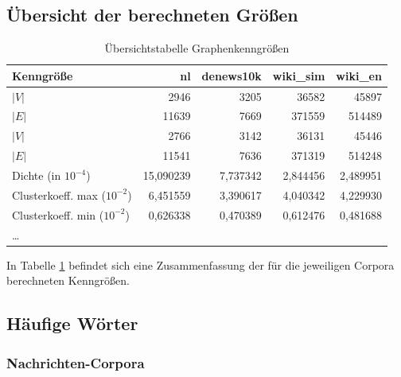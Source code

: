 \documentclass[11pt, a4paper]{article}
\begin{document}
\subsection{Übersicht der berechneten Größen}
\begin{table}[ht]
    \begin{tabular}{l*{4}{r}}
    \toprule
    Kenngröße & nl & denews10k & wiki\_sim & wiki\_en \\
    \midrule
    $|V|$                       & 2946      & 3205      & 36582     & 45897  \\
    $|E|$                       & 11639     & 7669      & 371559    & 514489 \\
    $|V|$\footnotemark[6]       & 2766      & 3142      & 36131     & 45446  \\
    $|E|$\footnotemark[6]       & 11541     & 7636      & 371319    & 514248 \\
    Dichte (in $10^{-4}$)       & 15,090239 & 7,737342  & 2,844456  & 2,489951 \\
    Clusterkoeff. max ($10^{-2}$) & 6,451559 & 3,390617 & 4,040342  & 4,229930 \\
    Clusterkoeff. min ($10^{-2}$) & 0,626338 & 0,470389 & 0,612476  & 0,481688 \\
    \dots                       &           &           &           &          \\
    \bottomrule
    \end{tabular}
    \caption{Übersichtstabelle Graphenkenngrößen}
    \label{tab-zsf}
\end{table}

In Tabelle \ref{tab-zsf} befindet sich eine Zusammenfassung der für die
jeweiligen Corpora berechneten Kenngrößen.


\subsection{H\"aufige W\"orter}

\subsubsection{Nachrichten-Corpora}
\end{document}
